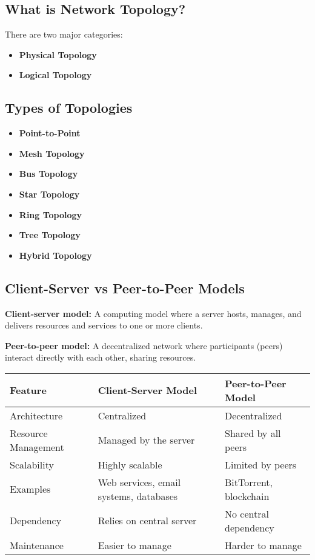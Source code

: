 \documentclass[11pt]{article}
\begin{document}
\subsection*{What is Network Topology?}
There are two major categories:
\begin{itemize}
    \item \textbf{Physical Topology}
    \item \textbf{Logical Topology}
\end{itemize}

\subsection*{Types of Topologies}
\begin{itemize}
    \item \textbf{Point-to-Point}
    \item \textbf{Mesh Topology}
    \item \textbf{Bus Topology}
    \item \textbf{Star Topology}
    \item \textbf{Ring Topology}
    \item \textbf{Tree Topology}
    \item \textbf{Hybrid Topology}
\end{itemize}

\subsection*{Client-Server vs Peer-to-Peer Models}
\textbf{Client-server model:} A computing model where a server hosts, manages, and delivers resources and services to one or more clients.

\textbf{Peer-to-peer model:} A decentralized network where participants (peers) interact directly with each other, sharing resources.

\begin{center}
\begin{tabular}{|p{4cm}|p{5cm}|p{5cm}|}
\hline
\textbf{Feature} & \textbf{Client-Server Model} & \textbf{Peer-to-Peer Model} \\
\hline
Architecture & Centralized & Decentralized \\
\hline
Resource Management & Managed by the server & Shared by all peers \\
\hline
Scalability & Highly scalable & Limited by peers \\
\hline
Examples & Web services, email systems, databases & BitTorrent, blockchain \\
\hline
Dependency & Relies on central server & No central dependency \\
\hline
Maintenance & Easier to manage & Harder to manage \\
\hline
\end{tabular}
\end{center}
\end{document}
